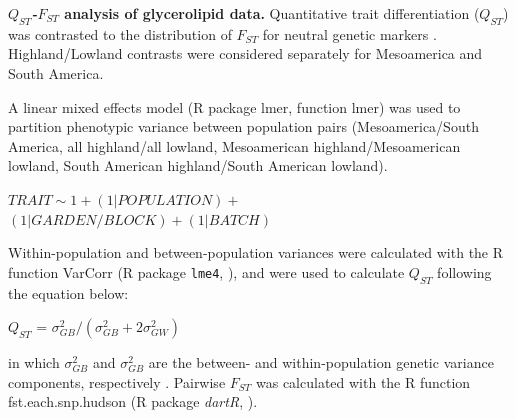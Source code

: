 \documentclass[9pt,twocolumn,twoside,lineno]{BioRxiv}
\begin{document}
\textbf{\textit{$Q_{ST}$-$F_{ST}$} analysis of glycerolipid data.}
Quantitative trait differentiation ($Q_{ST}$) was contrasted to the distribution of $F_{ST}$ for neutral genetic markers \cite{whitlock2008evolutionary}.
Highland/Lowland contrasts were considered separately for Mesoamerica and South America.

A linear mixed effects model (R package lmer, function lmer) was used to partition phenotypic variance between population pairs (Mesoamerica/South America, all highland/all lowland, Mesoamerican highland/Mesoamerican lowland, South American highland/South American lowland).
\begin{center}
${ TRAIT \sim 1 + (1|POPULATION) + }$\\
${(1|GARDEN/BLOCK) + (1|BATCH)}$
\end{center}
Within-population and between-population variances were calculated with the R function VarCorr (R package \texttt{lme4}, \citealp{bates2014lme4}), and were used to calculate $Q_{ST}$ following the equation below:
\begin{center}
$Q_{ST}$ = \(\sigma^{2}_{GB}/(\sigma^{2}_{GB}+2\sigma^{2}_{GW})\)
\end{center}
\noindent in which $\sigma^{2}_{GB}$ and $\sigma^{2}_{GB}$ are the between- and within-population genetic variance components, respectively \cite{Leinonen2013-ic}.
Pairwise $F_{ST}$ was calculated with the R function fst.each.snp.hudson (R package \textit{dartR}, \citealp{gruber2018dartr}).
\end{document}
